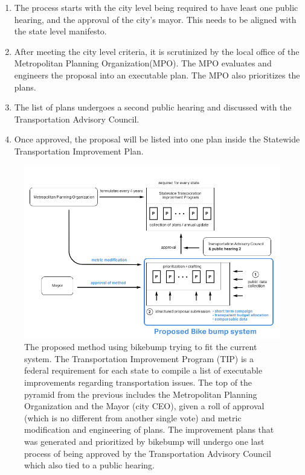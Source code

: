 \begin{enumerate}
\item The process starts with the city level being required to have least one public hearing, and the approval of the city's mayor. This needs to be aligned with the state level manifesto.
\item After meeting the city level criteria, it is scrutinized by the local office of the Metropolitan Planning Organization(MPO). The MPO evaluates and engineers the proposal into an executable plan.  The MPO also prioritizes the plans.
\item The list of plans undergoes a second public hearing and discussed with the Transportation Advisory Council.
\item Once approved, the proposal will be listed into one plan inside the Statewide Transportation Improvement Plan.
\end{enumerate}

\begin{figure}[!htb]
  \includegraphics{chapters/4/fig/proposed_process.png}               
  \caption[proposed process]{The proposed method using bikebump trying to fit the current system. The Transportation Improvement Program (TIP) is a federal requirement for each state to compile
a list of executable improvements regarding transportation issues. The top of the pyramid from the previous includes the Metropolitan Planning
Organization and the Mayor (city CEO), given a roll of approval (which is no different from another single vote) and metric modification and engineering
of plans. The improvement plans that was generated and prioritized by bikebump will undergo one last process of being approved by the
Transportation Advisory Council which also tied to a public hearing.
} 
  \label{fig:proposed}
\end{figure}

